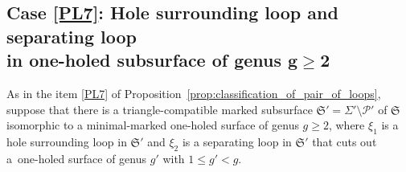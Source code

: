 \documentclass[pdftex]{sigma}
\numberwithin{equation}{section}
\theoremstyle{definition}
\begin{document}
\subsection[Case \ref{PL7}: Hole surrounding loop and separating loop in one-holed subsurface of genus g>= 2]{Case \ref{PL7}: Hole surrounding loop and separating loop\\ in one-holed subsurface of genus $\boldsymbol{g\ge 2}$}
As in the item \ref{PL7} of Proposition~\ref{prop:classification_of_pair_of_loops}, suppose that there is a triangle-compatible marked subsurface $\mathfrak{S}'=\Sigma'\setminus\mathcal{P}'$ of $\mathfrak{S}$ isomorphic to a minimal-marked one-holed surface of genus $g\ge 2$, where $\xi_1$ is a hole surrounding loop in $\mathfrak{S}'$ and $\xi_2$ is a separating loop in $\mathfrak{S'}$ that cuts out a~one-holed surface of genus $g'$ with $1\le g'<g$.
\end{document}
